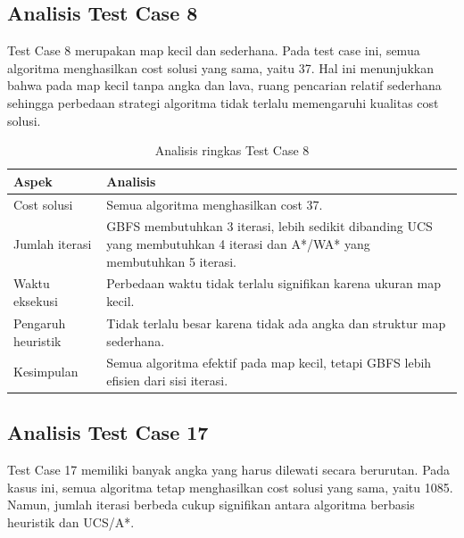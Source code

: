 \subsection{Analisis Test Case 8}

Test Case 8 merupakan map kecil dan sederhana. 
Pada test case ini, semua algoritma menghasilkan cost solusi yang sama, yaitu 37. 
Hal ini menunjukkan bahwa pada map kecil tanpa angka dan lava, ruang pencarian relatif sederhana sehingga perbedaan strategi algoritma tidak terlalu memengaruhi kualitas cost solusi.

\begin{table}[H]
	\centering
	\caption{Analisis ringkas Test Case 8}
	\begin{tabular}{|p{4cm}|p{10cm}|}
		\hline
		\rowcolor{blue!15}
		\textbf{Aspek} & \textbf{Analisis} \\
		\hline
		Cost solusi & Semua algoritma menghasilkan cost 37. \\
		\hline
		Jumlah iterasi & GBFS membutuhkan 3 iterasi, lebih sedikit dibanding UCS yang membutuhkan 4 iterasi dan A*/WA* yang membutuhkan 5 iterasi. \\
		\hline
		Waktu eksekusi & Perbedaan waktu tidak terlalu signifikan karena ukuran map kecil. \\
		\hline
		Pengaruh heuristik & Tidak terlalu besar karena tidak ada angka dan struktur map sederhana. \\
		\hline
		Kesimpulan & Semua algoritma efektif pada map kecil, tetapi GBFS lebih efisien dari sisi iterasi. \\
		\hline
	\end{tabular}
\end{table}

\subsection{Analisis Test Case 17}

Test Case 17 memiliki banyak angka yang harus dilewati secara berurutan. 
Pada kasus ini, semua algoritma tetap menghasilkan cost solusi yang sama, yaitu 1085. 
Namun, jumlah iterasi berbeda cukup signifikan antara algoritma berbasis heuristik dan UCS/A*.

